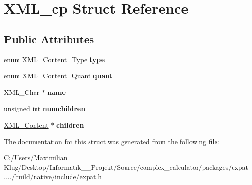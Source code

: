 \hypertarget{struct_x_m_l__cp}{}\section{X\+M\+L\+\_\+cp Struct Reference}
\label{struct_x_m_l__cp}
\subsection*{Public Attributes}
\begin{DoxyCompactItemize}
\item 
\mbox{\label{struct_x_m_l__cp_a98deeadbd7d0e20387a29f9030c2a397}} 
enum X\+M\+L\+\_\+\+Content\+\_\+\+Type {\bfseries type}
\item 
\mbox{\label{struct_x_m_l__cp_a85e6c8f3118df403b0d15491c93ae9e7}} 
enum X\+M\+L\+\_\+\+Content\+\_\+\+Quant {\bfseries quant}
\item 
\mbox{\label{struct_x_m_l__cp_a7f06eaeb1604d4c2f2fa19f4dd13167c}} 
X\+M\+L\+\_\+\+Char $\ast$ {\bfseries name}
\item 
\mbox{\label{struct_x_m_l__cp_a5395f658297ee88a3ab45dfdbe389ef1}} 
unsigned int {\bfseries numchildren}
\item 
\mbox{\label{struct_x_m_l__cp_a09c80a4bc4a029f785e262e9ca166b79}} 
\mbox{\hyperlink{struct_x_m_l__cp}{X\+M\+L\+\_\+\+Content}} $\ast$ {\bfseries children}
\end{DoxyCompactItemize}


The documentation for this struct was generated from the following file\+:\begin{DoxyCompactItemize}
\item 
C\+:/\+Users/\+Maximilian Klug/\+Desktop/\+Informatik\+\_\+\_\+\+Projekt/\+Source/complex\+\_\+calculator/packages/expat..../build/native/include/expat.\+h\end{DoxyCompactItemize}
